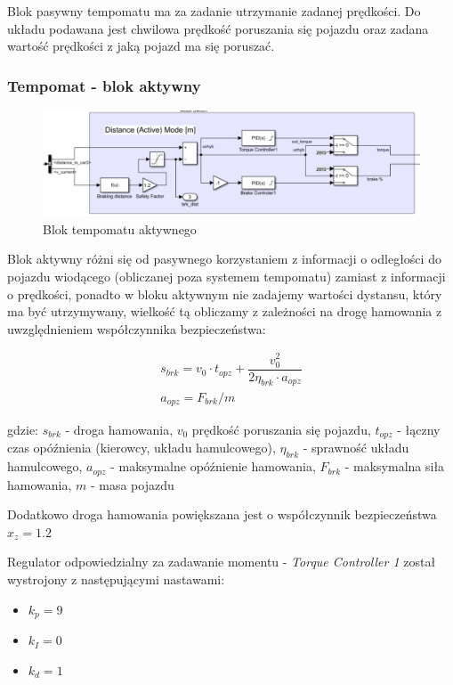 \documentclass[12pt, a4paper, headings=normal]{article}
\begin{document}
Blok pasywny tempomatu ma za zadanie utrzymanie zadanej prędkości. Do układu podawana
jest chwilowa prędkość poruszania się pojazdu oraz zadana wartość prędkości z jaką pojazd
ma się poruszać.

\subsubsection{Tempomat - blok aktywny}

\begin{figure}[H]
	\centering
	\includegraphics[width=\textwidth]{tempo_act.png}
	\caption{Blok tempomatu aktywnego}
	\label{fig:tempo_act}
\end{figure}

Blok aktywny różni się od pasywnego korzystaniem z informacji o odległości do pojazdu
wiodącego (obliczanej poza systemem tempomatu) zamiast z informacji o prędkości, ponadto
w bloku aktywnym nie zadajemy wartości dystansu, który ma być utrzymywany, wielkość 
tą obliczamy z zależności na drogę hamowania z uwzględnieniem współczynnika bezpieczeństwa:

\begin{equation}
	\label{eq:temp_act_dist}
	\begin{array}{c}
	s_{brk} = v_0 \cdot t_{opz} + \dfrac{v_{0}^2}{2 \eta_{brk} \cdot a_{opz}}\\[20pt]
	a_{opz} = F_{brk} / m
	\end{array}
\end{equation}

gdzie: $s_{brk}$ - droga hamowania, $v_0$ prędkość poruszania się pojazdu, $t_{opz}$ -
łączny czas opóźnienia (kierowcy, układu hamulcowego), $\eta_{brk}$ - sprawność układu
hamulcowego, $a_{opz}$ - maksymalne opóźnienie hamowania, $F_{brk}$ - maksymalna siła 
hamowania, $m$ - masa pojazdu

Dodatkowo droga hamowania powiększana jest o współczynnik bezpieczeństwa $x_z = 1.2$

\bigskip

Regulator odpowiedzialny za zadawanie momentu - \textit{Torque Controller 1} został 
wystrojony z następującymi nastawami:
\begin{itemize}
	\item $k_p = 9$
	\item $k_I = 0$
	\item $k_d = 1$
\end{itemize}
\end{document}
